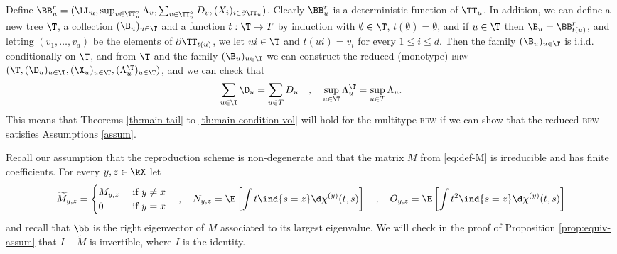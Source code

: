\documentclass[10pt,a4paper]{article}
\newcommand{\brw}{\textsc{brw}\xspace}
\newcommand{\wM}{\widetilde{M}}
\renewcommand{\kx}{s}
\newcommand{\repscheme}{reproduction scheme\xspace}
\begin{document}
Define $\BB^r_u = (\LL_u, \sup_{v\in\TT_u^\circ} \Lambda_v, \sum_{v\in\TT_u^\circ} D_v, (X_i)_{i \in \partial\TT_u} )$. %
Clearly $\BB^r_u$ is a deterministic function of $\TT_u$. In addition, we can define a new tree $\T$, a collection $(\B_u)_{u\in\T}$ and a function $t:\T\to T$ by induction with $\emptyset\in\T$, $t(\emptyset) = \emptyset$, and if $u\in\T$ then $\B_u = \BB^r_{t(u)}$, and letting $(v_1, \dots, v_d)$ be the elements of $\partial\TT_{t(u)}$, we let $ui\in \T$ and $t(ui) = v_i$ for every $1\leq i \leq d$. Then the family $(\B_u)_{u\in\T}$ is i.i.d. conditionally on $\T$, and from $\T$ and the family $(\B_u)_{u\in\T}$ we can construct the reduced (monotype) \brw $(\T, (\D_u)_{u\in\T}, (\X_u)_{u\in\T}, (\Lambda^\T_u)_{u\in\T})$, and we can check that 
\[ \sum_{u\in\T} \D_u = \sum_{u\in T} D_u \quad , \quad \sup_{u\in\T} \Lambda^\T_u = \sup_{u\in T} \Lambda_u . \]
This means that Theorems \ref{th:main-tail} to \ref{th:main-condition-vol} will hold for the multitype \brw if we can show that the reduced \brw satisfies Assumptions \ref{assum}. 



Recall our assumption that the \repscheme is non-degenerate and that the matrix $M$ from \eqref{eq:def-M} is irreducible and has finite coefficients. For every $y,z\in\kX$ let
\[ \wM_{y,z} = 
\begin{cases}
M_{y,z} &\text{ if } y\neq x\\
0 &\text{ if } y=x 
\end{cases}
\quad , \quad 
N_{y,z} = \E\left[\int t \ind{\kx=z} \d\chi^{(y)}(t,\kx)\right] 
\quad , \quad
O_{y,z} = \E\left[\int t^2 \ind{\kx=z} \d\chi^{(y)}(t,\kx)\right] 
\]
and recall that $\bb$ is the right eigenvector of $M$ associated to its largest eigenvalue. We will check in the proof of Proposition \ref{prop:equiv-assum} that $I-\wM$ is invertible, where $I$ is the identity. 
\end{document}

